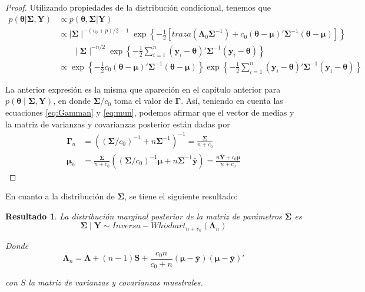 \documentclass[
  10pt,
  spanish,
]{book}
\newtheorem{proposition}{Resultado}[chapter]
\theoremstyle{definition}
\theoremstyle{definition}
\theoremstyle{definition}
\theoremstyle{definition}
\theoremstyle{remark}
\begin{document}
\begin{proof}
{}Utilizando propiedades de la distribución condicional, tenemos que
\begin{align*}
p(\boldsymbol \theta|\boldsymbol \Sigma,\mathbf{Y})&\propto p(\boldsymbol \theta, \boldsymbol \Sigma|\mathbf{Y})\\
&\propto \mid \boldsymbol \Sigma\mid ^{-(v_0+p)/2-1}
\exp\left\{ -\frac{1}{2}\left[traza(\boldsymbol \Lambda_0\boldsymbol \Sigma^{-1})+
c_0(\boldsymbol \theta-\boldsymbol \mu)'\boldsymbol \Sigma^{-1}(\boldsymbol \theta-\boldsymbol \mu)\right]\right\}\\
&\ \ \ \ \ \ \ \ \mid \boldsymbol \Sigma\mid ^{-n/2}\exp\left\{-\frac{1}{2}\sum_{i=1}^n(\mathbf{y}_i-\boldsymbol \theta)'\boldsymbol \Sigma^{-1}(\mathbf{y}_i-\boldsymbol \theta)\right\}\\
&\propto \exp\left\{ -\frac{1}{2}
c_0(\boldsymbol \theta-\boldsymbol \mu)'\boldsymbol \Sigma^{-1}(\boldsymbol \theta-\boldsymbol \mu)\right\}\exp\left\{-\frac{1}{2}\sum_{i=1}^n(\mathbf{y}_i-\boldsymbol \theta)'\boldsymbol \Sigma^{-1}(\mathbf{y}_i-\boldsymbol \theta)\right\}
\end{align*}

La anterior expresión es la misma que apareción en el capítulo anterior para \(p(\boldsymbol \theta\mid\boldsymbol \Sigma,\mathbf{Y})\), en donde \(\boldsymbol \Sigma/c_0\) toma el valor de \(\boldsymbol \Gamma\). Así, teniendo en cuenta las ecuaciones \eqref{eq:Gamman} y \eqref{eq:mun}, podemos afirmar que el vector de medias y la matriz de varianzas y covarianzas posterior están dadas por
\begin{align}
\boldsymbol \Gamma_n&=((\boldsymbol \Sigma/c_0)^{-1}+n\boldsymbol \Sigma^{-1})^{-1}=\frac{\boldsymbol \Sigma}{n+c_0}\\
\boldsymbol \mu_n&=\frac{\boldsymbol \Sigma}{n+c_0}((\boldsymbol \Sigma/c_0)^{-1}\boldsymbol \mu+n\boldsymbol \Sigma^{-1}\bar{\mathbf{y}})=\frac{n\bar{\mathbf{Y}}+c_0\boldsymbol \mu}{n+c_0}
\end{align}
\end{proof}

En cuanto a la distribución de \(\boldsymbol \Sigma\), se tiene el siguiente resultado:

\begin{proposition}
\protect\hypertarget{prp:PosSigma}{}{\label{prp:PosSigma} }La distribución marginal posterior de la matriz de parámetros \(\boldsymbol \Sigma\) es
\begin{equation*}
\boldsymbol \Sigma\mid \mathbf{Y} \sim Inversa-Whishart_{n+v_0}(\boldsymbol \Lambda_n)
\end{equation*}

Donde
\begin{equation}\label{bLambda_n}
\boldsymbol \Lambda_n=\boldsymbol \Lambda+(n-1)\mathbf{S}+\frac{c_0n}{c_0+n}(\boldsymbol \mu-\bar{\mathbf{y}})(\boldsymbol \mu-\bar{\mathbf{y}})'
\end{equation}

con \(S\) la matriz de varianzas y covarianzas muestrales.
\end{proposition}
\end{document}
